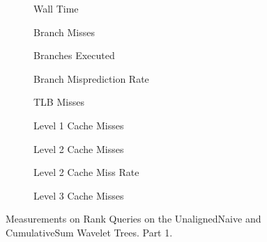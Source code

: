 \begin{figure}\tiny

\begin{subfigure}{0.30\textwidth}
	
	\caption{Wall Time}
	\label{fig:CumulativeSumRankWalltime}
\end{subfigure}
\hfill
\begin{subfigure}{0.30\textwidth}
	
	\caption{Branch Misses}
	\label{fig:CumulativeSumRankBranchMiss}
\end{subfigure}
\hfill
\begin{subfigure}{0.30\textwidth}
	
	\caption{Branches Executed}
	\label{fig:CumulativeSumRankBranchExe}
\end{subfigure}


\begin{subfigure}{0.30\textwidth}
	
	\caption{Branch Misprediction Rate}
	\label{fig:CumulativeSumRankBranchMissRate}
\end{subfigure}
\hfill
\begin{subfigure}{0.30\textwidth}
	
	\caption{TLB Misses}
	\label{fig:CumulativeSumRankTLBMiss}
\end{subfigure}
\hfill
\begin{subfigure}{0.30\textwidth}
	
	\caption{Level 1 Cache Misses}
	\label{fig:CumulativeSumRankL1CM}
\end{subfigure}

\begin{subfigure}{0.30\textwidth}
	
	\caption{Level 2 Cache Misses}
	\label{fig:CumulativeSumRankL2CM}
\end{subfigure}
%	
\hfill
\begin{subfigure}{0.30\textwidth}
	
	\caption{Level 2 Cache Miss Rate}
	\label{fig:CumulativeSumRankL2CMRate}
\end{subfigure}
\hfill
\begin{subfigure}{0.30\textwidth}
	
	\caption{Level 3 Cache Misses}
	\label{fig:CumulativeSumRankL3CM}
\end{subfigure}

\caption{Measurements on Rank Queries on the UnalignedNaive and CumulativeSum Wavelet Trees. Part 1.}
\label{fig:CumulativeSumRank}
\end{figure}





